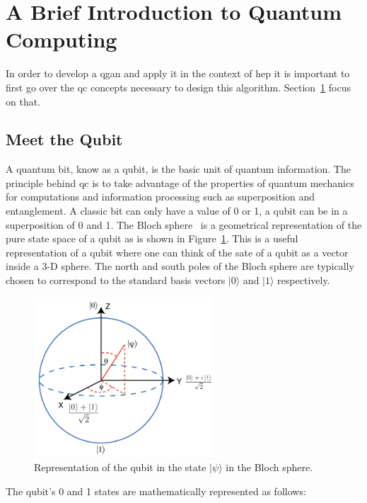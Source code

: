 \section{A Brief Introduction to Quantum Computing}
\label{sec:qc}

In order to develop a \gls{qgan} and apply it in the context of \gls{hep} it is
important to first go over the \gls{qc} concepts necessary to design this 
algorithm. Section~\ref{sec:qc} focus on that.

\subsection{Meet the Qubit}
\label{sec:qubit}

A quantum bit, know as a qubit, is the basic unit of quantum information. The 
principle behind \gls{qc} is to take advantage of the properties of quantum 
mechanics for computations and information processing such as superposition and 
entanglement. A classic bit can only have a value of 0 or 1, a qubit can be in a
superposition of 0 and 1. The Bloch sphere~\cite{Bloch} is a geometrical 
representation of the pure state space of a qubit as is shown in Figure~\ref{fig:bloch}. 
This is a useful representation of a qubit where one can think of the sate of a 
qubit as a vector inside a 3-D sphere. The north and south poles of the Bloch 
sphere are typically chosen to correspond to the standard basis vectors $\vert 0 \rangle$
and $\vert 1 \rangle$ respectively.

\begin{figure}[!htbp]
\centering
	\includegraphics[width=0.60\textwidth]{figures/Bloch_sphere.png}
\caption{Representation of the qubit in the state $\vert \psi \rangle$ in the
Bloch sphere.}
\label{fig:bloch}
\end{figure}

The qubit's 0 and 1 states are mathematically represented as follows:

